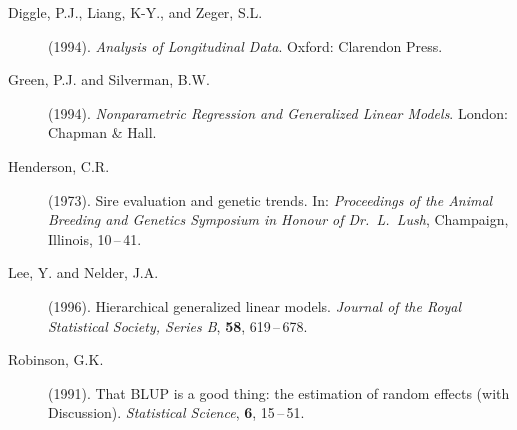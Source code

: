 \documentclass[twoside]{report}
\begin{document}


\begin{description}
\item[Diggle, P.J., Liang, K-Y., and Zeger, S.L.] (1994).
     {\it Analysis of Longitudinal Data}.
     Oxford: Clarendon Press.
\item[Green, P.J. and Silverman, B.W.] (1994).
     {\it Nonparametric Regression and Generalized Linear Models}.
     London: Chapman \& Hall.
\item[Henderson, C.R.] (1973).
     Sire evaluation and genetic trends.
     In: {\it Proceedings of the Animal Breeding and Genetics Symposium in
     Honour of Dr.\ L.\ Lush}, Champaign, Illinois, 10\,--\,41.
\item[Lee, Y. and Nelder, J.A.] (1996).
     Hierarchical generalized linear models.
     {\it Journal of the Royal Statistical Society, Series B}, {\bf 58},
      619\,--\,678.
\item[Robinson, G.K.] (1991).
     That BLUP is a good thing: the estimation of random effects (with Discussion).
     {\it Statistical Science}, {\bf 6}, 15\,--\,51.
\end{description}
\end{document}
